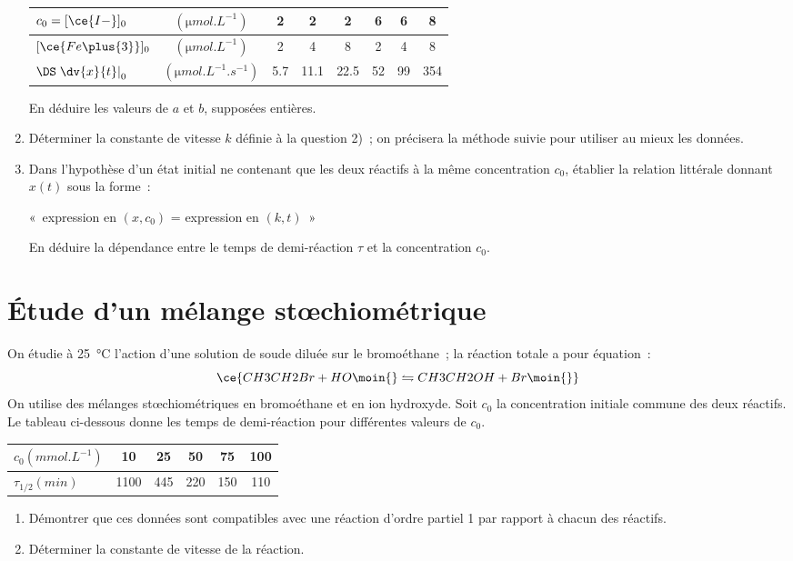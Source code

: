 \documentclass[a4paper, 12pt, final, garamond]{book}
\begin{document}
\begin{enumerate}
\begin{center}
            \begin{tabular}{lccccccc}
                \toprule 
                $c_0 = [\ce{I-}]_0$ &
                $(\si{\micro mol.L^{-1}})$ &
                2 & 2 & 2 & 6 & 6 & 8\\
                \midrule
                $[\ce{Fe\plus{3}}]_0$ &
                $(\si{\micro mol.L^{-1}})$ &
                2 & 4 & 8 & 2 & 4 & 8\\
                \midrule
                $\DS \left. \dv{x}{t} \right|_{0}$ &
                $(\si{\micro mol.L^{-1}.s^{-1}})$ &
                \num{5.7} & \num{11.1} & \num{22.5} & 52 & 99 & 354\\
                \bottomrule
            \end{tabular}
        \end{center}
        En déduire les valeurs de $a$ et $b$, supposées entières.
    \item Déterminer la constante de vitesse $k$ définie à la question 2)~; on
        précisera la méthode suivie pour utiliser au mieux les données.
    \item Dans l'hypothèse d'un état initial ne contenant que les deux réactifs
        à la même concentration $c_0$, établier la relation littérale donnant
        $x(t)$ sous la forme~:
        \begin{center}
            «~expression en $(x,c_0)$ = expression en $(k,t)$~»
        \end{center}
        En déduire la dépendance entre le temps de demi-réaction $\tau$ et la
        concentration $c_0$.
\end{enumerate}

\section{Étude d'un mélange stœchiométrique}
On étudie à \SI{25}{\degreeCelsius} l'action d'une solution de soude diluée sur
le bromoéthane~; la réaction totale a pour équation~:
\[\ce{CH3CH2Br + HO\moin{} \leftrightharpoons CH3CH2OH + Br\moin{}}\]
On utilise des mélanges stœchiométriques en bromoéthane et en ion hydroxyde.
Soit $c_0$ la concentration initiale commune des deux réactifs. Le tableau
ci-dessous donne les temps de demi-réaction pour différentes valeurs de $c_0$.
\begin{center}
    \begin{tabular}{lccccc}
        \toprule 
        $c_0 (\si{mmol.L^{-1}})$ &
        10 & 25 & 50 & 75 & 100\\
        \midrule
        $\tau_{1/2} (\si{min})$ &
        1100 & 445 & 220 & 150 & 110\\
        \bottomrule
    \end{tabular}
\end{center}
\begin{enumerate}
    \item Démontrer que ces données sont compatibles avec une réaction d'ordre
        partiel 1 par rapport à chacun des réactifs.
    \item Déterminer la constante de vitesse de la réaction.
\end{enumerate}
\end{document}
